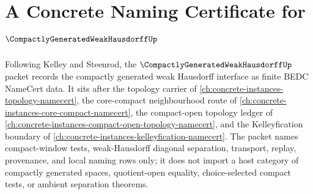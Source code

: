 \chapter{A Concrete Naming Certificate for $\CompactlyGeneratedWeakHausdorffUp$}
\label{ch:concrete-instances-compactly-generated-weak-hausdorff-namecert}

Following Kelley and Steenrod, the $\CompactlyGeneratedWeakHausdorffUp$ packet records the compactly generated weak Hausdorff interface as finite BEDC NameCert data. It sits after the topology carrier of \autoref{ch:concrete-instances-topology-namecert}, the core-compact neighbourhood route of \autoref{ch:concrete-instances-core-compact-namecert}, the compact-open topology ledger of \autoref{ch:concrete-instances-compact-open-topology-namecert}, and the Kelleyfication boundary of \autoref{ch:concrete-instances-kelleyfication-namecert}. The packet names compact-window tests, weak-Hausdorff diagonal separation, transport, replay, provenance, and local naming rows only; it does not import a host category of compactly generated spaces, quotient-open equality, choice-selected compact tests, or ambient separation theorems.

